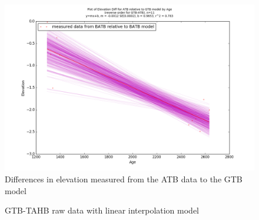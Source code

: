 \begin{figure}[h]
	\includegraphics[width=0.9\linewidth]{data/gias/theGIA_ATB_relative_to_GTB.png}
	\caption{Differences in elevation measured from the ATB data to the GTB model}
	\label{fig:gias_ATBxGTB}
\end{figure}
\newpage










\begin{figure}[h]
	\caption{GTB-TAHB raw data with linear interpolation model}
	\label{fig:data_GTBxTAHB}
\end{figure}
\newpage

